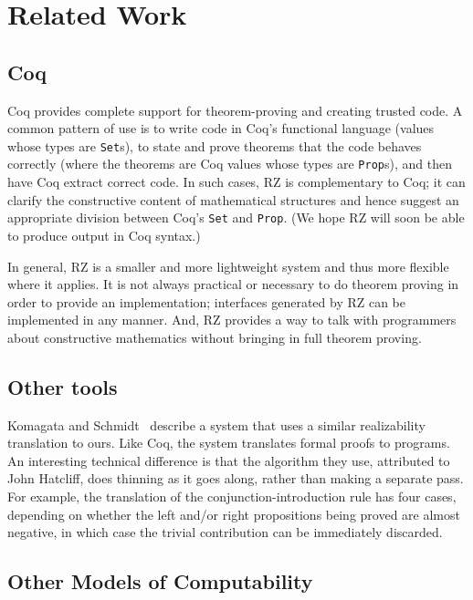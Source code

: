\section{Related Work}
\label{sec:related-work}

\subsection{Coq}
\label{sec:comparison-with-coq}

Coq provides complete support for
theorem-proving and creating trusted code.  A common pattern of use
is to write code in Coq's functional language (values whose
types are \texttt{Set}s), to state and prove theorems
that the code behaves correctly (where the theorems are Coq values
whose types are \texttt{Prop}s), and then have Coq extract
correct code. In such cases, RZ is complementary to
Coq;  it can clarify the constructive content of mathematical
structures and hence suggest an appropriate division between Coq's
\texttt{Set} and \texttt{Prop}. (We hope RZ will soon be able to 
produce output in Coq syntax.)

\iflong
In general, RZ is a smaller and more lightweight system and thus more
flexible where it applies. It is not always practical or necessary to
do theorem proving in order to provide an implementation; interfaces
generated by RZ can be implemented in any manner. And, RZ provides a way to talk with
programmers about constructive mathematics without bringing in
full theorem proving.
\fi %


\subsection{Other tools}

Komagata and Schmidt~\cite{komagata+:tr95} describe a system that uses
a similar realizability translation to ours. Like Coq, the system
translates formal proofs to programs.
%
An interesting technical difference is that the algorithm they use,
attributed to John Hatcliff, does thinning as it goes along, rather
than making a separate pass. 
\iflong
For example, the translation of the
conjunction-introduction rule has four cases, depending on whether the
left and/or right propositions being proved are almost negative, in
which case the trivial contribution can be immediately discarded.
\fi

\subsection{Other Models of Computability}
\label{sec:models-of-computability}

